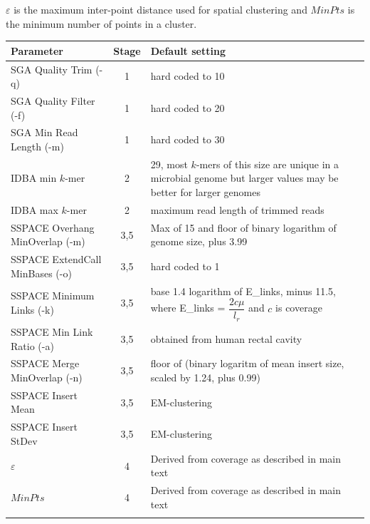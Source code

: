 \documentclass{bioinfo}
\begin{document}
$\varepsilon$ is the maximum inter-point distance used for spatial clustering and $MinPts$ is the minimum number of points
in a cluster.

\begin{table}[!t]
{\begin{tabular}{l|c|l}\toprule
Parameter                       & Stage & Default setting  \\\midrule
SGA Quality Trim (-q)           & 1     & hard coded to 10 \\
SGA Quality Filter (-f)         & 1     & hard coded to 20  \\
SGA Min Read Length (-m)        & 1     & hard coded to 30 \\
IDBA min $k$-mer                & 2     & 29, most $k$-mers of this size are unique in a microbial genome but larger values may be better for larger genomes \\
IDBA max $k$-mer                & 2     & maximum read length of trimmed reads \\
SSPACE Overhang MinOverlap (-m) & 3,5   & Max of 15 and floor of binary logarithm of genome size, plus 3.99  \\
SSPACE ExtendCall MinBases (-o) & 3,5   & hard coded to 1 \\
SSPACE Minimum Links (-k)       & 3,5   & base 1.4 logarithm of E\_links, minus 11.5, where E\_links = $\dfrac{2c\mu}{l_r}$ and $c$ is coverage \\
SSPACE Min Link Ratio (-a)      & 3,5   & obtained from human rectal cavity \\
SSPACE Merge MinOverlap (-n)    & 3,5   & floor of (binary logaritm of mean insert size, scaled by 1.24, plus 0.99) \\
SSPACE Insert Mean 	        & 3,5   & EM-clustering \\
SSPACE Insert StDev             & 3,5   & EM-clustering \\
$\varepsilon$                   & 4     & Derived from coverage as described in main text \\
$MinPts$                        & 4     & Derived from coverage as described in main text \\
\botrule \\
\end{tabular}}{}
\end{table}
\end{document}
